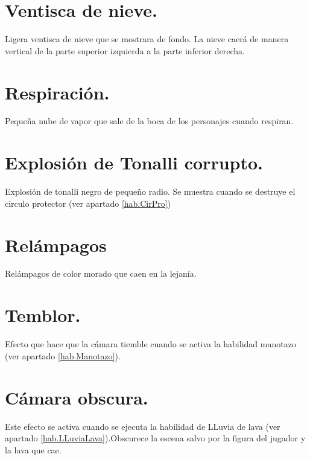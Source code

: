 \section{Ventisca de nieve.} \label{FX:VenNieve}
Ligera ventisca de nieve que se mostrara de fondo. La nieve caerá de manera vertical de la parte superior izquierda a la parte inferior derecha.

\section{Respiración.} \label{FX:Respiracion}
Pequeña nube de vapor que sale de la boca de los personajes cuando respiran.

\section{Explosión de Tonalli corrupto.} \label{FX:ExTonCor}
Explosión de tonalli negro de pequeño radio. Se muestra cuando se destruye el circulo protector (ver apartado \ref{hab.CirPro})

\section{Relámpagos} \label{FX:Relam}
Relámpagos de color morado que caen en la lejanía.

\section{Temblor.} \label{FX:temblor}
Efecto que hace que la cámara tiemble cuando se activa la habilidad manotazo (ver apartado \ref{hab.Manotazo}).

\section{Cámara obscura.} \label{FX:CamObs}
Este efecto se activa cuando se ejecuta la habilidad de LLuvia de lava (ver apartado \ref{hab.LLuviaLava}).Obscurece la escena salvo por la figura del jugador y la lava que cae.  